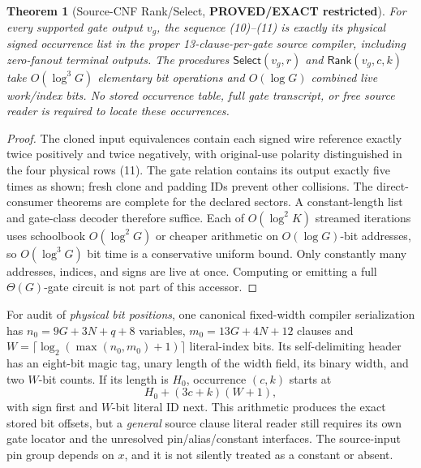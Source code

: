 \documentclass[11pt]{article}
\newtheorem{theorem}{Theorem}
\newcommand{\Select}{\mathsf{Select}}
\newcommand{\Rank}{\mathsf{Rank}}
\begin{document}
\begin{theorem}[Source-CNF Rank/Select, \textbf{PROVED/EXACT restricted}]
For every supported gate output $v_g$, the sequence (10)--(11)
is exactly its physical signed occurrence list in the proper
13-clause-per-gate source compiler, including zero-fanout
terminal outputs. The procedures
$\Select(v_g,r)$ and $\Rank(v_g,c,k)$ take
$O(\log^3G)$ elementary bit operations and
$O(\log G)$ combined live work/index bits. No stored
occurrence table, full gate transcript, or free source reader
is required to \emph{locate} these occurrences.
\end{theorem}
\begin{proof}
The cloned input equivalences contain each signed wire
reference exactly twice positively and twice negatively,
with original-use polarity distinguished in the four physical
rows (11). The gate relation contains its output exactly five
times as shown; fresh clone and padding IDs prevent other
collisions. The direct-consumer theorems are complete for the
declared sectors. A constant-length list and gate-class decoder
therefore suffice. Each of $O(\log^2K)$ streamed iterations
uses schoolbook $O(\log^2G)$ or cheaper arithmetic on
$O(\log G)$-bit addresses, so $O(\log^3G)$ bit time is a
conservative uniform bound. Only constantly many addresses,
indices, and signs are live at once. Computing or emitting a
full $\Theta(G)$-gate circuit is not part of this accessor.
\end{proof}

For audit of \emph{physical bit positions}, one canonical fixed-width
compiler serialization has
$n_0=9G+3N+q+8$ variables,
$m_0=13G+4N+12$ clauses and
$W=\lceil\log_2(\max(n_0,m_0)+1)\rceil$ literal-index bits.
Its self-delimiting header has an eight-bit magic tag, unary
length of the width field, its binary width, and two $W$-bit
counts. If its length is $H_0$, occurrence $(c,k)$ starts at
\[
                 H_0+(3c+k)(W+1),                           \tag{12}
\]
with sign first and $W$-bit literal ID next. This arithmetic
produces the exact stored bit offsets, but a \emph{general}
source clause literal reader still requires its own gate
locator and the unresolved pin/alias/constant interfaces.
The source-input pin group depends on $x$, and it is not
silently treated as a constant or absent.
\end{document}
